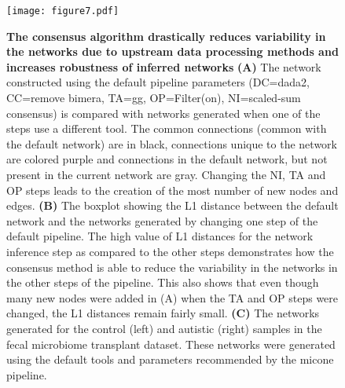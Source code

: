   \begin{figure}[H]
    \centering
    \texttt{[image: figure7.pdf]}
  \end{figure}
  \begin{figure}[H]
    \centering
    \caption{
      \textbf{The consensus algorithm drastically reduces variability in the networks due to upstream data processing methods and increases robustness of inferred networks}
      \textbf{(A)} The network constructed using the default pipeline parameters (DC=\ac{dada2}, CC=remove bimera, TA=\ac{gg}, OP=Filter(on), NI=scaled-sum consensus) is compared with networks generated when one of the steps use a different tool.
      The common connections (common with the default network) are in black, connections unique to the network are colored purple and connections in the default network, but not present in the current network are gray.
      Changing the NI, TA and OP steps leads to the creation of the most number of new nodes and edges.
      \textbf{(B)} The boxplot showing the L1 distance between the default network and the networks generated by changing one step of the default pipeline.
      The high value of L1 distances for the network inference step as compared to the other steps demonstrates how the consensus method is able to reduce the variability in the networks in the other steps of the pipeline.
      This also shows that even though many new nodes were added in (A) when the TA and OP steps were changed, the L1 distances remain fairly small.
      \textbf{(C)} The networks generated for the control (left) and autistic (right) samples in the fecal microbiome transplant dataset.
      These networks were generated using the default tools and parameters recommended by the \ac{micone} pipeline.
    }
    \label{fig:figure7}
  \end{figure}
